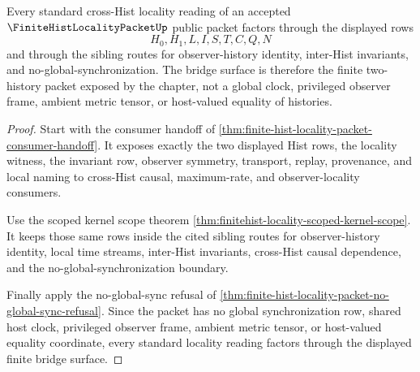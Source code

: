 \begin{theorem}
\label{thm:finite-hist-locality-packet-bridge-surface}
Every standard cross-Hist locality reading of an accepted $\FiniteHistLocalityPacketUp$ public packet factors through the displayed rows
$$
H_0,H_1,L,I,S,T,C,Q,N
$$
and through the sibling routes for observer-history identity, inter-Hist invariants, and no-global-synchronization. The bridge surface is therefore the finite two-history packet exposed by the chapter, not a global clock, privileged observer frame, ambient metric tensor, or host-valued equality of histories.
\end{theorem}
\begin{proof}
Start with the consumer handoff of \autoref{thm:finite-hist-locality-packet-consumer-handoff}. It exposes exactly the two displayed Hist rows, the locality witness, the invariant row, observer symmetry, transport, replay, provenance, and local naming to cross-Hist causal, maximum-rate, and observer-locality consumers.

Use the scoped kernel scope theorem \autoref{thm:finitehist-locality-scoped-kernel-scope}. It keeps those same rows inside the cited sibling routes for observer-history identity, local time streams, inter-Hist invariants, cross-Hist causal dependence, and the no-global-synchronization boundary.

Finally apply the no-global-sync refusal of \autoref{thm:finite-hist-locality-packet-no-global-sync-refusal}. Since the packet has no global synchronization row, shared host clock, privileged observer frame, ambient metric tensor, or host-valued equality coordinate, every standard locality reading factors through the displayed finite bridge surface.
\end{proof}


\begin{closurestatus}{\FiniteHistLocalityPacketUp}
  \theoryclosure{\matureClosure}
  \formalstatus{\unformalizedV}
\end{closurestatus}
